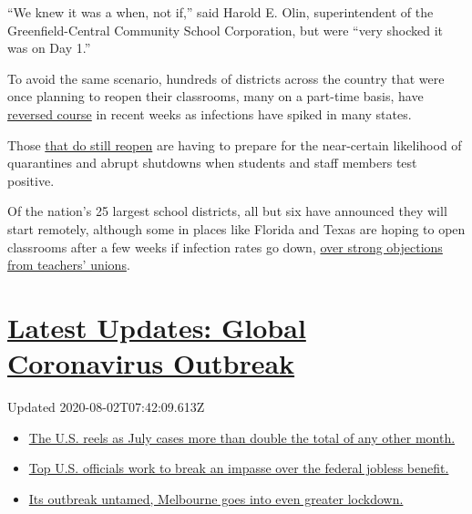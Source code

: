 ``We knew it was a when, not if,'' said Harold E. Olin, superintendent
of the Greenfield-Central Community School Corporation, but were ``very
shocked it was on Day 1.''

To avoid the same scenario, hundreds of districts across the country
that were once planning to reopen their classrooms, many on a part-time
basis, have
\href{https://www.nytimes.com/2020/07/13/us/lausd-san-diego-school-reopening.html}{reversed
course} in recent weeks as infections have spiked in many states.

Those
\href{https://www.nytimes.com/2020/07/14/us/coronavirus-schools-fall.html}{that
do still reopen} are having to prepare for the near-certain likelihood
of quarantines and abrupt shutdowns when students and staff members test
positive.

Of the nation's 25 largest school districts, all but six have announced
they will start remotely, although some in places like Florida and Texas
are hoping to open classrooms after a few weeks if infection rates go
down,
\href{https://www.nytimes.com/2020/07/29/us/teacher-union-school-reopening-coronavirus.html}{over
strong objections from teachers' unions}.

\hypertarget{latest-updates-global-coronavirus-outbreak}{%
\section{\texorpdfstring{\href{https://www.nytimes.com/2020/08/01/world/coronavirus-covid-19.html?action=click\&pgtype=Article\&state=default\&region=MAIN_CONTENT_1\&context=storylines_live_updates}{Latest
Updates: Global Coronavirus
Outbreak}}{Latest Updates: Global Coronavirus Outbreak}}\label{latest-updates-global-coronavirus-outbreak}}

Updated 2020-08-02T07:42:09.613Z

\begin{itemize}
\tightlist
\item
  \href{https://www.nytimes.com/2020/08/01/world/coronavirus-covid-19.html?action=click\&pgtype=Article\&state=default\&region=MAIN_CONTENT_1\&context=storylines_live_updates\#link-34047410}{The
  U.S. reels as July cases more than double the total of any other
  month.}
\item
  \href{https://www.nytimes.com/2020/08/01/world/coronavirus-covid-19.html?action=click\&pgtype=Article\&state=default\&region=MAIN_CONTENT_1\&context=storylines_live_updates\#link-780ec966}{Top
  U.S. officials work to break an impasse over the federal jobless
  benefit.}
\item
  \href{https://www.nytimes.com/2020/08/01/world/coronavirus-covid-19.html?action=click\&pgtype=Article\&state=default\&region=MAIN_CONTENT_1\&context=storylines_live_updates\#link-2bc8948}{Its
  outbreak untamed, Melbourne goes into even greater lockdown.}
\end{itemize}

